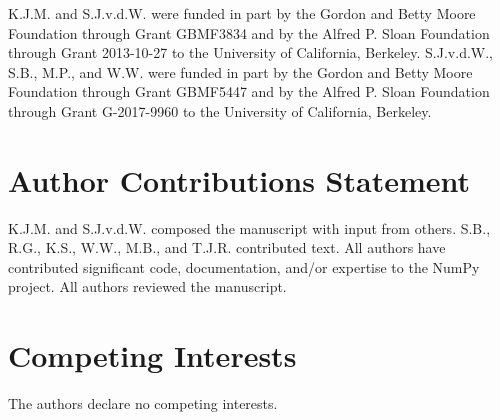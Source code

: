 \documentclass[twocolumn]{article}
\begin{document}
K.J.M. and S.J.v.d.W. were funded in part by the Gordon and Betty Moore
Foundation through Grant GBMF3834 and by the Alfred P. Sloan Foundation through
Grant 2013-10-27 to the University of California, Berkeley.
S.J.v.d.W., S.B., M.P., and W.W. were funded in part by the Gordon
and Betty Moore Foundation through Grant GBMF5447 and by the Alfred
P. Sloan Foundation through Grant G-2017-9960 to the University of
California, Berkeley.

\section*{Author Contributions Statement}

K.J.M. and S.J.v.d.W. composed the manuscript with input from others.
S.B., R.G., K.S., W.W., M.B., and T.J.R. contributed text.
All authors have contributed significant code, documentation, and/or expertise
to the NumPy project.
All authors reviewed the manuscript.

\section*{Competing Interests}

The authors declare no competing interests.
\end{document}
